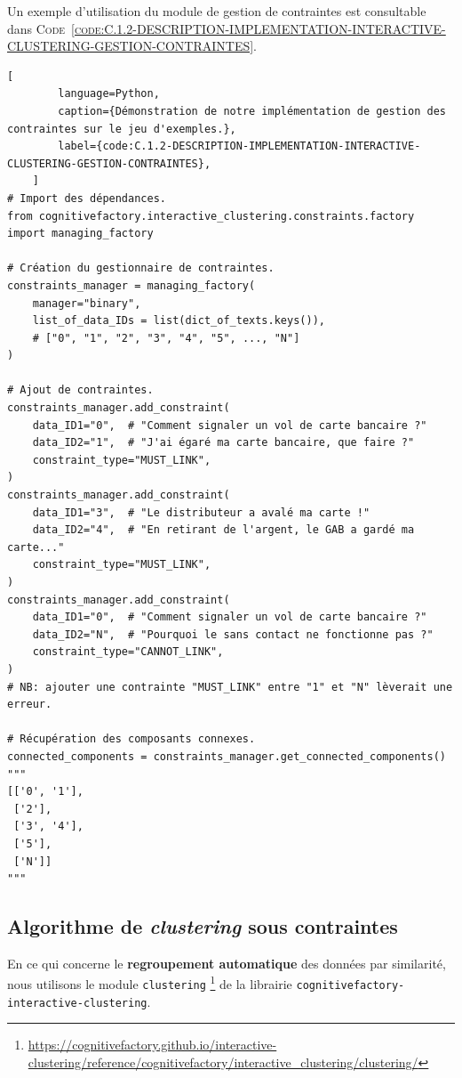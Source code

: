 	Un exemple d'utilisation du module de gestion de contraintes est consultable dans \textsc{Code~\ref{code:C.1.2-DESCRIPTION-IMPLEMENTATION-INTERACTIVE-CLUSTERING-GESTION-CONTRAINTES}}.
	
	\begin{lstlisting}[
		language=Python,
		caption={Démonstration de notre implémentation de gestion des contraintes sur le jeu d'exemples.},
		label={code:C.1.2-DESCRIPTION-IMPLEMENTATION-INTERACTIVE-CLUSTERING-GESTION-CONTRAINTES},
	]
# Import des dépendances.
from cognitivefactory.interactive_clustering.constraints.factory import managing_factory

# Création du gestionnaire de contraintes.
constraints_manager = managing_factory(
	manager="binary",
	list_of_data_IDs = list(dict_of_texts.keys()),
	# ["0", "1", "2", "3", "4", "5", ..., "N"]
)

# Ajout de contraintes.
constraints_manager.add_constraint(
	data_ID1="0",  # "Comment signaler un vol de carte bancaire ?"
	data_ID2="1",  # "J'ai égaré ma carte bancaire, que faire ?"
	constraint_type="MUST_LINK",
)
constraints_manager.add_constraint(
	data_ID1="3",  # "Le distributeur a avalé ma carte !"
	data_ID2="4",  # "En retirant de l'argent, le GAB a gardé ma carte..."
	constraint_type="MUST_LINK",
)
constraints_manager.add_constraint(
	data_ID1="0",  # "Comment signaler un vol de carte bancaire ?"
	data_ID2="N",  # "Pourquoi le sans contact ne fonctionne pas ?"
	constraint_type="CANNOT_LINK",
)
# NB: ajouter une contrainte "MUST_LINK" entre "1" et "N" lèverait une erreur.

# Récupération des composants connexes.
connected_components = constraints_manager.get_connected_components()
"""
[['0', '1'],
 ['2'],
 ['3', '4'],
 ['5'],
 ['N']]
"""
	\end{lstlisting}
	
	
	\subsection{Algorithme de \textit{clustering} sous contraintes}
	\label{annex:C.1.3-DESCRIPTION-IMPLEMENTATION-INTERACTIVE-CLUSTERING-ALGORITHMES-CLUSTERING-SOUS-CONTRAINTES}
	
	En ce qui concerne le \textbf{regroupement automatique} des données par similarité, nous utilisons le module \texttt{clustering} \footnote{
		\url{https://cognitivefactory.github.io/interactive-clustering/reference/cognitivefactory/interactive_clustering/clustering/}
	} de la librairie \texttt{cognitivefactory-interactive-clustering}.
	

